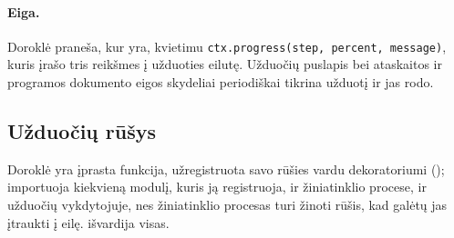 \paragraph{Eiga.} Doroklė praneša, kur yra, kvietimu \texttt{ctx.progress(step, percent,
message)}, kuris įrašo tris reikšmes į užduoties eilutę. Užduočių puslapis bei ataskaitos ir
programos dokumento eigos skydeliai periodiškai tikrina užduotį ir jas rodo.

\subsection{Užduočių rūšys}

Doroklė yra įprasta funkcija, užregistruota savo rūšies vardu dekoratoriumi
 ();  importuoja kiekvieną
modulį, kuris ją registruoja, ir žiniatinklio procese, ir užduočių vykdytojuje, nes
žiniatinklio procesas turi žinoti rūšis, kad galėtų jas įtraukti į eilę. 
išvardija visas.

